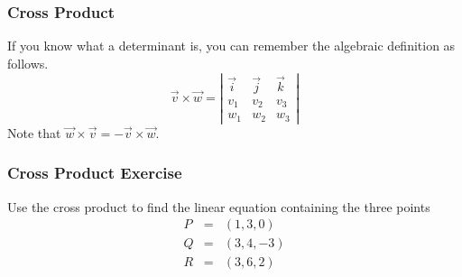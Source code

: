 \documentclass[xcolor=dvipsnames]{beamer}
\begin{document}
\begin{frame}
  \frametitle{Cross Product}
  If you know what a determinant is, you can remember the algebraic
  definition as follows.
  \begin{equation}
    \label{eq:abeekohc}
    \vec{v}\times\vec{w}=\left\vert
      \begin{array}{ccc}
        \vec{i} & \vec{j} & \vec{k} \\
        v_{1} & v_{2} & v_{3} \\
        w_{1} & w_{2} & w_{3}
      \end{array}\right\vert
  \end{equation}
  Note that $\vec{w}\times\vec{v}=-\vec{v}\times\vec{w}$.
\end{frame}

\begin{frame}
  \frametitle{Cross Product Exercise}
  {\ubung} Use the cross product to find the linear equation containing the
  three points
  \begin{equation}
    \label{eq:eiyeigaz}
    \begin{array}{rcl}
      P&=&(1,3,0) \\
      Q&=&(3,4,-3) \\
      R&=&(3,6,2)
    \end{array}
  \end{equation}
\end{frame}
\end{document}
